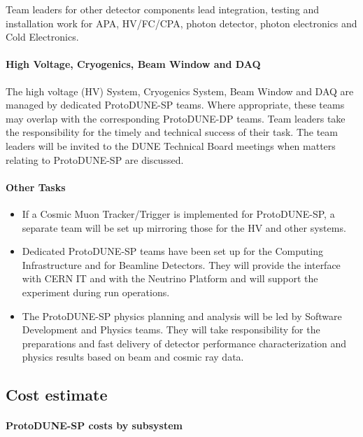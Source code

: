 Team leaders for other detector components lead integration, testing and installation work for APA, HV/FC/CPA, photon detector, photon electronics and Cold Electronics.


\paragraph{High Voltage, Cryogenics, Beam Window and DAQ }

The high voltage (HV) System, Cryogenics System, Beam Window and DAQ are managed by dedicated ProtoDUNE-SP teams. Where appropriate, these teams may overlap with the corresponding ProtoDUNE-DP teams. Team leaders take the responsibility for the timely and technical success of their task. The team leaders will be invited to the DUNE Technical Board meetings when matters relating to ProtoDUNE-SP are discussed.

\paragraph{Other Tasks}

\begin{itemize}
\item If a Cosmic Muon Tracker/Trigger is implemented for ProtoDUNE-SP, a separate team will be set up mirroring those for the HV and other systems. 

\item Dedicated ProtoDUNE-SP teams have been set up for the Computing Infrastructure and for Beamline Detectors. They will provide the interface with CERN IT and with the Neutrino Platform and will support the experiment during run operations.
\item The ProtoDUNE-SP physics planning and analysis will be led by Software Development and Physics teams. They will take responsibility for the preparations and fast delivery of detector performance characterization and physics results based on beam and cosmic ray data.
\end{itemize}

\subsection{Cost estimate}

\paragraph{ProtoDUNE-SP costs by subsystem}

